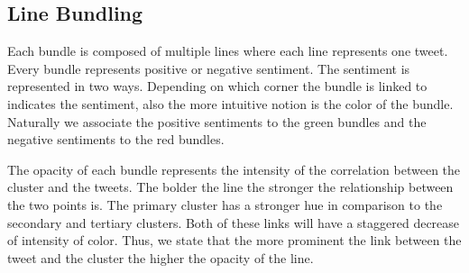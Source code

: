 \documentclass[journal]{vgtc}                %
\begin{document}
\subsection{Line Bundling}
Each bundle is composed of multiple lines where each line represents one tweet. Every bundle represents positive or negative sentiment. The sentiment is represented in two ways. Depending on which corner the bundle is linked to indicates the sentiment, also the more intuitive notion is the color of the bundle. Naturally we associate the positive sentiments to the green bundles and the negative sentiments to the red bundles.

The opacity of each bundle represents the intensity of the correlation between the cluster and the tweets. The bolder the line the stronger the relationship between the two points is. The primary cluster has a stronger hue in comparison to the secondary and tertiary clusters. Both of these links will have a staggered decrease of intensity of color. Thus, we state that the more prominent the link between the tweet and the cluster the higher the opacity of the line.
\end{document}
